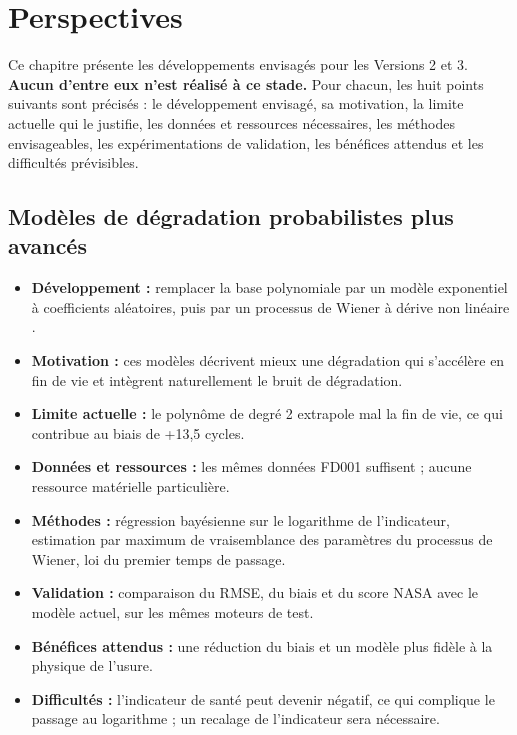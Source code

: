 \chapter{Perspectives}\label{sec:perspectives}

\chapintro

Ce chapitre présente les développements envisagés pour les Versions 2 et 3. \textbf{Aucun d'entre eux n'est réalisé à ce stade.} Pour chacun, les huit points suivants sont précisés : le développement envisagé, sa motivation, la limite actuelle qui le justifie, les données et ressources nécessaires, les méthodes envisageables, les expérimentations de validation, les bénéfices attendus et les difficultés prévisibles.

\section{Modèles de dégradation probabilistes plus avancés}\label{sec:p-degradation}

\begin{itemize}
\item \textbf{Développement :} remplacer la base polynomiale par un modèle exponentiel à coefficients aléatoires, puis par un processus de Wiener à dérive non linéaire \cite{gebraeel2005,si2012}.
\item \textbf{Motivation :} ces modèles décrivent mieux une dégradation qui s'accélère en fin de vie et intègrent naturellement le bruit de dégradation.
\item \textbf{Limite actuelle :} le polynôme de degré 2 extrapole mal la fin de vie, ce qui contribue au biais de +13,5 cycles.
\item \textbf{Données et ressources :} les mêmes données FD001 suffisent ; aucune ressource matérielle particulière.
\item \textbf{Méthodes :} régression bayésienne sur le logarithme de l'indicateur, estimation par maximum de vraisemblance des paramètres du processus de Wiener, loi du premier temps de passage.
\item \textbf{Validation :} comparaison du RMSE, du biais et du score NASA avec le modèle actuel, sur les mêmes moteurs de test.
\item \textbf{Bénéfices attendus :} une réduction du biais et un modèle plus fidèle à la physique de l'usure.
\item \textbf{Difficultés :} l'indicateur de santé peut devenir négatif, ce qui complique le passage au logarithme ; un recalage de l'indicateur sera nécessaire.
\end{itemize}

